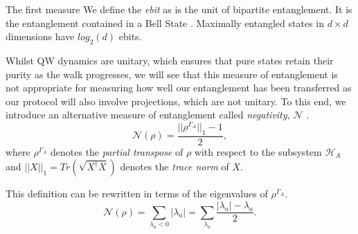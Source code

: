 The first measure 
We define the \emph{ebit} as is the unit of bipartite entanglement. It is the entanglement contained in a Bell State \cite{Eisert_2000}. Maximally entangled states in $d \times d$ dimensions have $log_2(d)$ ebits.

Whilst QW dynamics are unitary, which ensures that pure states retain their purity as the walk progresses, we will see that this measure of entanglement is not appropriate for measuring how well our entanglement has been transferred as our protocol will also involve projections, which are not unitary.
To this end, we introduce an alternative measure of entanglement called \emph{negativity,} $\mathcal{N}$ \cite{Vidal_2002}.
\begin{equation}
    \mathcal{N}(\rho) = \frac{||\rho^{\Gamma_A}||_1-1}{2},
\end{equation}
where $\rho^{\Gamma_A}$ denotes the \emph{partial transpose} of $\rho$ with respect to the subsystem $\mathcal{H}_A$ and $||X||_1 = Tr(\sqrt{X^\dagger X})$ denotes the \emph{trace norm} of $X$.\newline

This definition can be rewritten in terms of the eigenvalues of $\rho^{\Gamma_A}$.
\begin{equation}
    \mathcal{N}(\rho) = \sum_{\lambda_a < 0}|\lambda_a| = \sum_{\lambda_a} \frac{|\lambda_a| - \lambda_a}{2}.
\end{equation}

